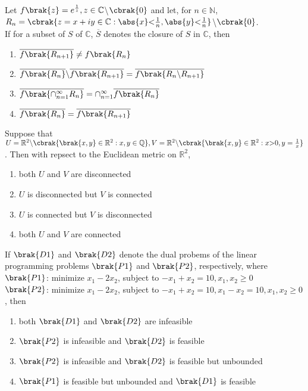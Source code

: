 \item{
Let $f\brak{z}=e^{\frac{1}{z}},z\in\mathbb{C}$\textbackslash$\cbrak{0}$ and let, for $n\in\mathbb{N}$,\\
$R_n=\cbrak{z=x+iy\in\mathbb{C}:\abs{x}\text{\textless}\frac{1}{n},\abs{y}\text{\textless}\frac{1}{n}}$\textbackslash$\cbrak{0}$.\\
If for a subset of $S$ of $\mathbb{C}$, $\overline{S}$ denotes the closure of $S$ in $\mathbb{C}$, then
\begin{multicols}{2}
\begin{enumerate}
\item $\overline{f\brak{R_{n+1}}}\neq f\brak{R_n}$
\item $\overline{f\brak{R_n}}\text{\textbackslash}\overline{f\brak{R_{n+1}}}=\overline{f\brak{R_n\text{\textbackslash}R_{n+1}}}$
\item $\overline{f\brak{\cap_{n=1}^{\infty}R_n}}=\cap_{n=1}^{\infty}\overline{f\brak{R_n}}$
\item $\overline{f\brak{R_n}}=\overline{f\brak{R_{n+1}}}$
\end{enumerate}
\end{multicols}
}
\item{
Suppose that $U=\mathbb{R}^2\text{\textbackslash}\cbrak{\brak{x,y}\in\mathbb{R}^2:x,y\in\mathbb{Q}},V=\mathbb{R}^2\text{\textbackslash}\cbrak{\brak{x,y}\in\mathbb{R}^2:x\text{\textgreater}0,y=\frac{1}{x}}$. Then with repsect to the Euclidean metric on $\mathbb{R}^2$,
\begin{multicols}{2} 
\begin{enumerate}
\item both $U$ and $V$ are disconnected
\item $U$ is disconnected but $V$ is connected
\item $U$ is connected but $V$ is disconnected 
\item both $U$ and $V$ are connected 
\end{enumerate}
\end{multicols}
}
\item{
If $\brak{D1}$ and $\brak{D2}$ denote the dual probems of the linear programming problems $\brak{P1}$ and $\brak{P2}$, respectively, where\\
$\brak{P1}$: minimize $x_1-2x_2$, subject to $-x_1+x_2=10,x_1,x_2\geq 0$\\
$\brak{P2}$: minimize $x_1-2x_2$, subject to $-x_1+x_2=10,x_1-x_2=10,x_1,x_2\geq 0$, then
\begin{enumerate}
\item both $\brak{D1}$ and $\brak{D2}$ are infeasible
\item $\brak{P2}$ is infeasible and $\brak{D2}$ is feasible
\item $\brak{P2}$ is infeasible and $\brak{D2}$ is feasible but unbounded
\item $\brak{P1}$ is feasible but unbounded and $\brak{D1}$ is feasible
\end{enumerate}
}
